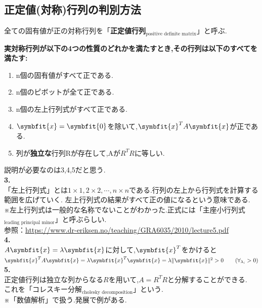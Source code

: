 \subsection{正定値(対称)行列の判別方法}
全ての固有値が正の対称行列を「\textbf{正定値行列}$_{\text{positive definite matrix}}$」と呼ぶ.
\begin{tcolorbox}[colframe=black!80,colback=white,title=正定値行列で互いに成り立つ5つの性質]
\textbf{実対称行列が以下の4つの性質のどれかを満たすとき,その行列は以下のすべてを満たす:}
    \begin{enumerate}
    \item n個の固有値がすべて正である.
    \item n個のピボットが全て正である.
    \item n個の左上行列式がすべて正である.
    \item $\symbfit{x}=\symbfit{0}$を除いて,$\symbfit{x}^TA\symbfit{x}$が正である.
    \item 列が\textbf{独立な}行列Rが存在して,Aが$R^TR$に等しい.
\end{enumerate}
\end{tcolorbox}
説明が必要なのは3,4,5だと思う.\\
\textbf{3.}\\
「左上行列式」とは$1\times1,2\times2,\cdots,n\times n$である.行列の左上から行列式を計算する範囲を広げていく.
左上行列式の結果がすべて正の値になるという意味である.\\
※左上行列式は一般的な名称でないことがわかった.正式には「主座小行列式$_{\text{leading principal minor}}$」と呼ぶらしい.\\
参照：\url{https://www.dr-eriksen.no/teaching/GRA6035/2010/lecture5.pdf}\\
\textbf{4.}\\
$A\symbfit{x}=\lambda\symbfit{x}$に対して,$\symbfit{x}^T$をかけると
$\symbfit{x}^TA\symbfit{x}=\lambda\symbfit{x}^T\symbfit{x}=\lambda\|\symbfit{x}\|^2>0\qquad(\forall_{\lambda_i} > 0)$\\
\hypertarget{cholesky}{}
\textbf{5.}\\
正定値行列は独立な列からなる$R$を用いて,$A=R^T R$と分解することができる.\\
これを「コレスキー分解$_{\text{cholesky decomposition}}$」という.\\※「数値解析」で扱う.発展で例がある.

